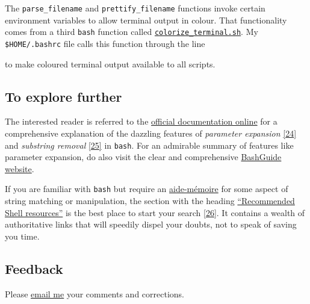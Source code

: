 \documentclass[
  a4paper,
]{article}
\newenvironment{Shaded}{\begin{snugshade}}{\end{snugshade}}
\newcommand{\BuiltInTok}[1]{\textcolor[rgb]{0.80,0.80,0.80}{#1}}
\newcommand{\NormalTok}[1]{\textcolor[rgb]{0.80,0.80,0.80}{#1}}
\newcommand{\StringTok}[1]{\textcolor[rgb]{0.80,0.58,0.58}{#1}}
\newcommand{\VariableTok}[1]{\textcolor[rgb]{0.80,0.80,0.80}{#1}}
\begin{document}
The \texttt{parse\_filename} and \texttt{prettify\_filename} functions
invoke certain environment variables to allow terminal output in colour.
That functionality comes from a third \texttt{bash} function called
\href{scripts/colorize_terminal.sh}{\texttt{colorize\_terminal.sh}}. My
\texttt{\$HOME/.bashrc} file calls this function through the line

\begin{Shaded}
\end{Shaded}

to make coloured terminal output available to all scripts.

\hypertarget{to-explore-further}{%
\subsection{To explore further}\label{to-explore-further}}

The interested reader is referred to the
\href{https://www.gnu.org/savannah-checkouts/gnu/bash/manual/bash.html\#Shell-Parameter-Expansion}{official
documentation online} for a comprehensive explanation of the dazzling
features of \emph{parameter expansion}
\protect\hyperlink{ref-shellparamexp}{{[}24{]}} and \emph{substring
removal} \protect\hyperlink{ref-wikisubstring}{{[}25{]}} in
\texttt{bash}. For an admirable summary of features like parameter
expansion, do also visit the clear and comprehensive
\href{https://mywiki.wooledge.org/BashGuide/Parameters}{BashGuide
website}.

If you are familiar with \texttt{bash} but require an
\href{https://www.thefreedictionary.com/aide+memoire}{aide-mémoire} for
some aspect of string matching or manipulation, the section with the
heading
\href{https://wiki.bash-hackers.org/start\#recommended_shell_resources}{``Recommended
Shell resources''} is the best place to start your search
\protect\hyperlink{ref-bhwstart}{{[}26{]}}. It contains a wealth of
authoritative links that will speedily dispel your doubts, not to speak
of saving you time.

\hypertarget{feedback}{%
\subsection{Feedback}\label{feedback}}

Please \href{mailto:feedback.swanlotus@gmail.com}{email me} your
comments and corrections.
\end{document}
